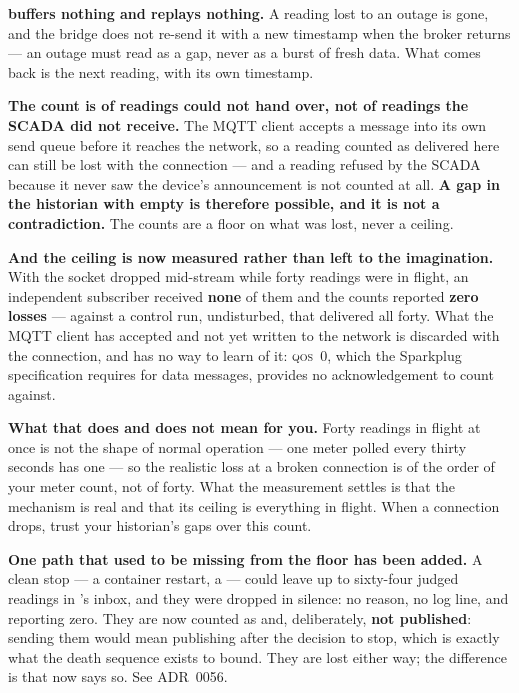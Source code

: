 \textbf{\prog buffers nothing and replays nothing.} A reading lost to an outage is gone, and
the bridge does not re-send it with a new timestamp when the broker returns --- an outage must
read as a gap, never as a burst of fresh data. What comes back is the next reading, with its
own timestamp.

\begin{warning}
\textbf{The count is of readings \prog could not hand over, not of readings the SCADA did not
receive.} The MQTT client accepts a message into its own send queue before it reaches the
network, so a reading counted as delivered here can still be lost with the connection --- and
a reading refused by the SCADA because it never saw the device's announcement is not counted
at all. \textbf{A gap in the historian with  empty is therefore
possible, and it is not a contradiction.} The counts are a floor on what was lost, never a
ceiling.

\textbf{And the ceiling is now measured rather than left to the imagination.} With the socket
dropped mid-stream while forty readings were in flight, an independent subscriber received
\textbf{none} of them and the counts reported \textbf{zero losses} --- against a control run,
undisturbed, that delivered all forty. What the MQTT client has accepted and not yet written to
the network is discarded with the connection, and \prog has no way to learn of it: \textsc{qos}~0,
which the Sparkplug specification requires for data messages, provides no acknowledgement to
count against.

\textbf{What that does and does not mean for you.} Forty readings in flight at once is not the
shape of normal operation --- one meter polled every thirty seconds has one --- so the realistic
loss at a broken connection is of the order of your meter count, not of forty. What the
measurement settles is that the mechanism is real and that its ceiling is everything in flight.
When a connection drops, trust your historian's gaps over this count.

\textbf{One path that used to be missing from the floor has been added.} A clean stop --- a
container restart, a  --- could leave up to sixty-four judged readings in \prog's
inbox, and they were dropped in silence: no reason, no log line, and 
reporting zero. They are now counted as  and, deliberately,
\textbf{not published}: sending them would mean publishing after the decision to stop, which is
exactly what the death sequence exists to bound. They are lost either way; the difference is that
\prog now says so. See ADR~0056.
\end{warning}

